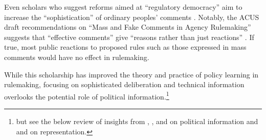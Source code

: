 Even scholars who suggest reforms aimed at ``regulatory democracy'' aim to increase the ``sophistication'' of ordinary peoples' comments \citep{Cuellar2014, Johnson2013}. Notably, the ACUS draft recommendations on ``Mass and Fake Comments in Agency Rulemaking'' suggests that ``effective comments'' give ``reasons rather than just reactions'' \citep[p. 33]{ACUS2018}. If true, most public reactions to proposed rules such as those expressed in mass comments would have no effect in rulemaking. 

While this scholarship has improved the theory and practice of policy learning in rulemaking, focusing on sophisticated deliberation and technical information overlooks the potential role of political information.\footnote{but see the below review of insights from \citet{Golden1998}, \citet{Nelson2012}, and \citet{Rauch2016} on political information and \citet{Reich1966} and \citet{Seifter2016UCLA} on representation.}






























